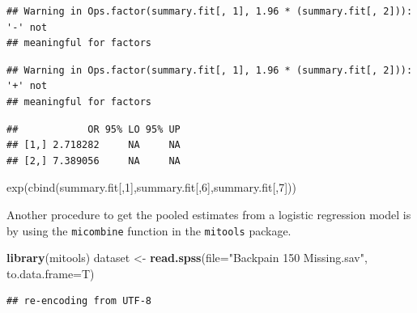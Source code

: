 \documentclass[
]{book}
\newenvironment{Shaded}{\begin{snugshade}}{\end{snugshade}}
\newcommand{\DataTypeTok}[1]{\textcolor[rgb]{0.13,0.29,0.53}{#1}}
\newcommand{\KeywordTok}[1]{\textcolor[rgb]{0.13,0.29,0.53}{\textbf{#1}}}
\newcommand{\NormalTok}[1]{#1}
\newcommand{\StringTok}[1]{\textcolor[rgb]{0.31,0.60,0.02}{#1}}
\begin{document}
\begin{verbatim}
## Warning in Ops.factor(summary.fit[, 1], 1.96 * (summary.fit[, 2])): '-' not
## meaningful for factors
\end{verbatim}

\begin{verbatim}
## Warning in Ops.factor(summary.fit[, 1], 1.96 * (summary.fit[, 2])): '+' not
## meaningful for factors
\end{verbatim}

\begin{Shaded}
\end{Shaded}

\begin{verbatim}
##            OR 95% LO 95% UP
## [1,] 2.718282     NA     NA
## [2,] 7.389056     NA     NA
\end{verbatim}

exp(cbind(summary.fit{[},1{]},summary.fit{[},6{]},summary.fit{[},7{]}))

Another procedure to get the pooled estimates from a logistic regression model is by using the \texttt{micombine} function in the \texttt{mitools} package.

\begin{Shaded}
\begin{Highlighting}[]
\KeywordTok{library}\NormalTok{(mitools)}
\NormalTok{dataset <-}\StringTok{ }\KeywordTok{read.spss}\NormalTok{(}\DataTypeTok{file=}\StringTok{"Backpain 150 Missing.sav"}\NormalTok{, }\DataTypeTok{to.data.frame=}\NormalTok{T)}
\end{Highlighting}
\end{Shaded}

\begin{verbatim}
## re-encoding from UTF-8
\end{verbatim}
\end{document}
